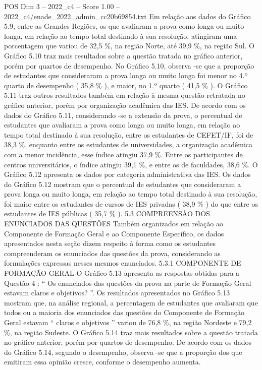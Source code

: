 \begin{textsample}{POS Dim 3 – 2022\_c4 – Score 1.00 – 2022\_c4/enade\_2022\_admin\_cc20b69854.txt}
Em relação aos dados do Gráfico 5.9, entre as Grandes Regiões, os que avaliaram a prova como longa ou muito longa, em relação ao tempo total destinado à sua resolução, atingiram uma porcentagem que variou de 32,5 \%, na região Norte, até 39,9 \%, na região Sul.
O Gráfico 5.10 traz mais resultados sobre a questão tratada no gráfico anterior, porém por quartos de desempenho.
No Gráfico 5.10, observa -se que a proporção de estudantes que consideraram a prova longa ou muito longa foi menor no 4.º quarto de desempenho ( 35,8 \% ), e maior, no 1.º quarto ( 41,5 \% ).
O Gráfico 5.11 traz outros resultados também em relação à mesma questão retratada no gráfico anterior, porém por organização acadêmica das IES.
De acordo com os dados do Gráfico 5.11, considerando -se a extensão da prova, o percentual de estudantes que avaliaram a prova como longa ou muito longa, em relação ao tempo total destinado à sua resolução, entre os estudantes de CEFET/IF, foi de 38,3 \%, enquanto entre os estudantes de universidades, a organização acadêmica com a menor incidência, esse índice atingiu 37,9 \%.
Entre os participantes de centros universitários, o índice atingiu 39,1 \%, e entre os de faculdades, 38,6 \%.
O Gráfico 5.12 apresenta os dados por categoria administrativa das IES.
Os dados do Gráfico 5.12 mostram que o percentual de estudantes que consideraram a prova longa ou muito longa, em relação ao tempo total destinado à sua resolução, foi maior entre os estudantes de cursos de IES privadas ( 38,9 \% ) do que entre os estudantes de IES públicas ( 35,7 \% ). 5.3 COMPREENSÃO DOS ENUNCIADOS DAS QUESTÕES Também organizados em relação ao Componente de Formação Geral e ao Componente Específico, os dados apresentados nesta seção dizem respeito à forma como os estudantes compreenderam os enunciados das questões da prova, considerando as formulações expressas nesses mesmos enunciados. 5.3.1 COMPONENTE DE FORMAÇÃO GERAL O Gráfico 5.13 apresenta as respostas obtidas para a Questão 4 : “ Os enunciados das questões da prova na parte de Formação Geral estavam claros e objetivos? ”.
Os resultados apresentados no Gráfico 5.13 mostram que, na análise regional, a percentagem de estudantes que avaliaram que todos ou a maioria dos enunciados das questões do Componente de Formação Geral estavam “ claros e objetivos ” variou de 76,8 \%, na região Nordeste e 79,2 \%, na região Sudeste.
O Gráfico 5.14 traz mais resultados sobre a questão tratada no gráfico anterior, porém por quartos de desempenho.
De acordo com os dados do Gráfico 5.14, segundo o desempenho, observa -se que a proporção dos que emitiram essa opinião cresce, conforme o desempenho aumenta.

\end{textsample}
